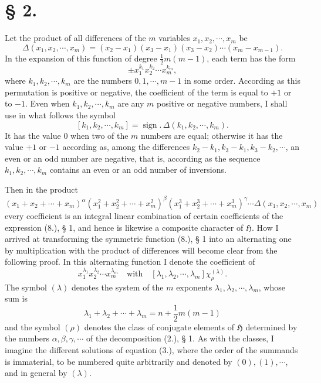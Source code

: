\documentclass[11pt]{article}
\newcommand{\Hgr}{\mathfrak{H}}
\newcommand{\sign}{\operatorname{sign}}
\begin{document}
\section*{§ 2.}

Let the product of all differences of the $m$ variables $x_1,x_2,\cdots,x_m$ be
\[
 \Delta(x_1,x_2,\cdots,x_m)=(x_2-x_1)(x_3-x_1)(x_3-x_2)\cdots(x_m-x_{m-1}).
\]
In the expansion of this function of degree $\frac12m(m-1)$, each term has the form
\[
 \pm x_1^{k_1}x_2^{k_2}\cdots x_m^{k_m},
\]
where $k_1,k_2,\cdots,k_m$ are the numbers $0,1,\cdots,m-1$ in some order. According as this permutation is positive or negative, the coefficient of the term is equal to $+1$ or to $-1$. Even when $k_1,k_2,\cdots,k_m$ are any $m$ positive or negative numbers, I shall use in what follows the symbol
\begin{equation}\tag{1.}
 [k_1,k_2,\cdots,k_m]=\sign.\,\Delta(k_1,k_2,\cdots,k_m).
\end{equation}
It has the value $0$ when two of the $m$ numbers are equal; otherwise it has the value $+1$ or $-1$ according as, among the differences $k_2-k_1,k_3-k_1,k_3-k_2,\cdots$, an even or an odd number are negative, that is, according as the sequence $k_1,k_2,\cdots,k_m$ contains an even or an odd number of inversions.

Then in the product
\begin{equation}\tag{2.}
 (x_1+x_2+\cdots+x_m)^\alpha(x_1^2+x_2^2+\cdots+x_m^2)^\beta(x_1^3+x_2^3+\cdots+x_m^3)^\gamma\cdots\Delta(x_1,x_2,\cdots,x_m)
\end{equation}
every coefficient is an integral linear combination of certain coefficients of the expression (8.), § 1, and hence is likewise a composite character of $\Hgr$. How I arrived at transforming the symmetric function (8.), § 1 into an alternating one by multiplication with the product of differences will become clear from the following proof. In this alternating function I denote the coefficient of
\[
 x_1^{\lambda_1}x_2^{\lambda_2}\cdots x_m^{\lambda_m}\quad\text{with}\quad [\lambda_1,\lambda_2,\cdots,\lambda_m]\chi_\rho^{(\lambda)}.
\]
The symbol $(\lambda)$ denotes the system of the $m$ exponents $\lambda_1,\lambda_2,\cdots,\lambda_m$, whose sum is
\begin{equation}\tag{3.}
 \lambda_1+\lambda_2+\cdots+\lambda_m=n+\frac12m(m-1)
\end{equation}
and the symbol $(\rho)$ denotes the class of conjugate elements of $\Hgr$ determined by the numbers $\alpha,\beta,\gamma,\cdots$ of the decomposition (2.), § 1. As with the classes, I imagine the different solutions of equation (3.), where the order of the summands is immaterial, to be numbered quite arbitrarily and denoted by $(0),(1),\cdots$, and in general by $(\lambda)$.
\end{document}
